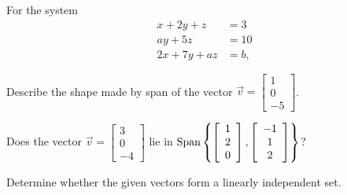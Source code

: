\documentclass[12pt]{exam}
\begin{document}
\begin{questions}
\setcounter{question}{2}
\question
For the system
\begin{align*}
	x + 2y + z & = 3 \\
    ay + 5z & = 10 \\
    2x + 7y + az & = b,
\end{align*}

\question
Describe the shape made by span of the vector 
$\vec{v} = \left[ \begin{array}{c}
1 \\ 0 \\ -5
\end{array} \right]$.

\question
Does the vector 
$\vec{v} = \left[ \begin{array}{c}
3 \\ 0 \\ -4
\end{array} \right]$
lie in
$\textnormal{Span} \left\lbrace \left[ \begin{array}{c}
1 \\ 2 \\ 0
\end{array} \right], 
\left[ \begin{array}{c}
-1 \\ 1 \\ 2
\end{array} \right]
\right\rbrace$?

\question
Determine whether the given vectors form a linearly independent set.
\end{questions}
\end{document}

